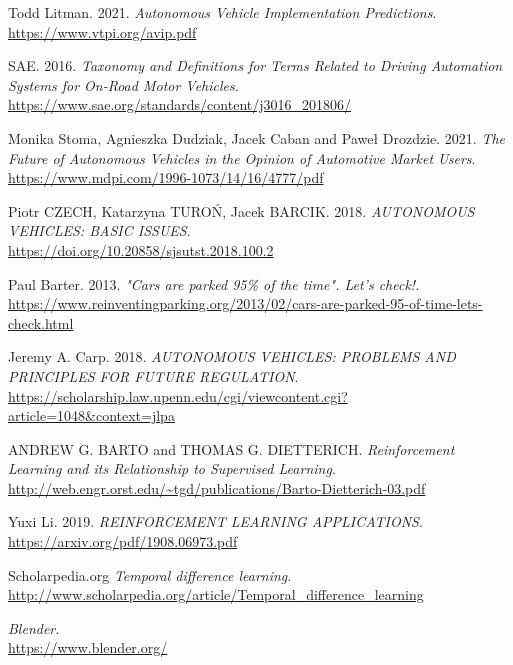 \documentclass[14pt]{extarticle}
\begin{document}
\newpage
\begin{thebibliography}{999}

  Todd Litman. 2021.
  \emph{Autonomous Vehicle Implementation Predictions}.\\
  \url{https://www.vtpi.org/avip.pdf}
  
  SAE. 2016.
  \emph{Taxonomy and Definitions for Terms Related to Driving Automation Systems for On-Road Motor Vehicles}.\\
  \url{https://www.sae.org/standards/content/j3016_201806/}
   
  Monika Stoma, Agnieszka Dudziak, Jacek Caban and Paweł Drozdzie. 2021.
  \emph{The Future of Autonomous Vehicles in the Opinion of Automotive
Market Users}.\\
  \url{https://www.mdpi.com/1996-1073/14/16/4777/pdf}
   
  Piotr CZECH, Katarzyna TUROŃ, Jacek BARCIK. 2018.
  \emph{AUTONOMOUS VEHICLES: BASIC ISSUES}.\\
  \url{https://doi.org/10.20858/sjsutst.2018.100.2}
  
  Paul Barter. 2013.
  \emph{"Cars are parked 95\% of the time". Let's check!}.\\
  \url{https://www.reinventingparking.org/2013/02/cars-are-parked-95-of-time-lets-check.html}
  
  Jeremy A. Carp. 2018.
  \emph{AUTONOMOUS VEHICLES: PROBLEMS AND PRINCIPLES FOR FUTURE REGULATION}.\\
  \url{https://scholarship.law.upenn.edu/cgi/viewcontent.cgi?article=1048&context=jlpa}
 
  ANDREW G. BARTO and THOMAS G. DIETTERICH.
  \emph{Reinforcement Learning and its Relationship to Supervised Learning}.\\
  \url{http://web.engr.orst.edu/~tgd/publications/Barto-Dietterich-03.pdf}
  
  Yuxi Li. 2019.
  \emph{REINFORCEMENT LEARNING APPLICATIONS}.\\
  \url{https://arxiv.org/pdf/1908.06973.pdf}
  
  Scholarpedia.org
  \emph{Temporal difference learning}.\\
  \url{http://www.scholarpedia.org/article/Temporal_difference_learning}
 
  \emph{Blender}.\\
  \url{https://www.blender.org/}
   

\end{thebibliography}
\end{document}

